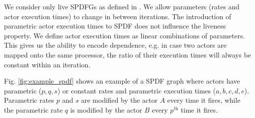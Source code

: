 \documentclass[]{eptcs}
\begin{document}
We consider only live SPDFGs as defined in \cite{2frad:all}. We allow parameters (rates and actor execution times) to change in between iterations. The introduction of parametric actor execution times to SPDF does not influence the liveness property. We define actor execution times as linear combinations of parameters. This gives us the ability to encode dependence, e.g. in case two actors are mapped onto the same processor, the ratio of their execution times will always be constant within an iteration.

Fig. \ref{fig:example_spdf} shows an example of a SPDF graph where actors have parametric ($p,q,s$) or constant rates and parametric execution times ($a,b,c,d,e$). Parametric rates $p$ and $s$ are modified by the actor $A$ every time it fires, while the parametric rate $q$ is modified by the actor $B$ every $p^\mathrm{th}$ time it fires.
\end{document}

